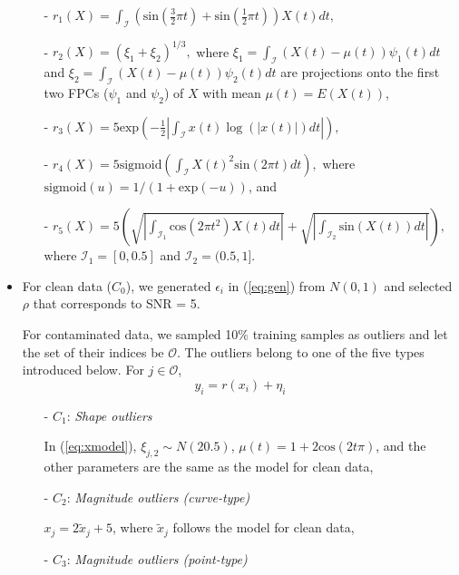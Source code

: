 \documentclass{article}
\let\oldref\ref
\renewcommand{\ref}[1]{(\oldref{#1})}
\begin{document}
\begin{itemize}
\begin{itemize}
\item[- ]  $r_1(X) =  \int_{\mathcal{I}} \left (\text{sin} \left(\frac{3}{2} \pi t \right) +  \text{sin} \left(\frac{1}{2} \pi t \right)\right)X(t)dt,$
\item[- ]  $r_2(X) = (\xi_1 + \xi_2)^{1/3},$ where  $\xi_1 = \int_{\mathcal{I}} (X(t) - \mu(t))\psi_1(t) dt$ and $\xi_2 = \int_{\mathcal{I}} (X(t) - \mu(t))\psi_2(t) dt$ are projections onto the first two FPCs ($\psi_1$ and $\psi_2$) of $X$ with mean $\mu(t) = E(X(t))$, 
\item[- ]  $r_3(X) = 5\text{exp}\left (- \frac{1}{2}\left| \int_{\mathcal{I}} x(t)\log(|x(t)|)dt \right| \right),$
\item[- ] 
$r_4(X) = 5\text{sigmoid}\left(\int_{\mathcal{I}}X(t)^2 \text{sin}(2\pi t) dt \right),$ where  $\text{sigmoid}(u) = 1/(1+ \text{exp}(-u))$, and
\item[- ] 
$r_5(X) = 5 \left( \sqrt{\left|\int_{\mathcal{I}_1} \text{cos}(2\pi t^2) X(t) dt \right|} + \sqrt{\left|\int_{\mathcal{I}_2} \text{sin}(X(t)) dt \right|} \right), $ where  $\mathcal{I}_1 = [0,0.5]$ and $\mathcal{I}_2 = (0.5,1]$. 
\end{itemize}

\item For clean data ($C_0$), we generated $\epsilon_i$ in \ref{eq:gen} from $N(0,1)$ and selected $\rho$ that corresponds to SNR = 5. 

For contaminated data, we sampled 10\% training samples as outliers and let the set of their indices be $\mathcal{O}$. The outliers belong to  one of the five types introduced below. For $j \in \mathcal{O}$, 
$$y_i = r(x_i) + \eta_i$$
\begin{itemize}
    \item[- ] $C_1$: \textit{Shape outliers}
    
    \vspace{1ex}
    In \ref{eq:xmodel},   $\xi_{j,2} \sim N(2 0.5)$, $\mu(t) = 1 + 2 \text{cos}(2t\pi)$, and the other parameters are the same as the model for clean data,
    \vspace{1ex}
    \item[- ] $C_2$: \textit{Magnitude outliers (curve-type)}     \vspace{1ex}
    
    $x_{j} = 2 \tilde{x}_{j} + 5$, where $\tilde{x}_j$ follows the model for clean data,
       \vspace{1ex}
    \item[- ] $C_3$: \textit{Magnitude outliers (point-type)}
    

\end{itemize}
\end{itemize}
\end{document}
